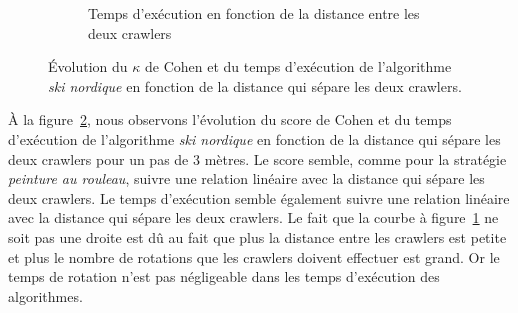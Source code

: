 \documentclass[francais,RandD]{rapportPFE}
\begin{document}
\begin{figure}[h!]
\begin{subfigure}[t]{0.49\linewidth}
						\caption{Temps d'exécution en fonction de la distance entre les deux crawlers}
						\label{fig:ski_nordique-time_vs_distance}
				\end{subfigure}
				\caption{Évolution du $\kappa$ de Cohen et du temps d'exécution de l'algorithme \textit{ski nordique} en fonction de la distance qui sépare les deux crawlers.}
				\label{fig:ski_nordique-distance}
			\end{figure}

			À la figure~\ref{fig:ski_nordique-distance}, nous observons l'évolution du score de Cohen et du temps d'exécution de l'algorithme \textit{ski nordique} en fonction de la distance qui sépare les deux crawlers pour un pas de 3 mètres.
			Le score semble, comme pour la stratégie \textit{peinture au rouleau}, suivre une relation linéaire avec la distance qui sépare les deux crawlers.
			Le temps d'exécution semble également suivre une relation linéaire avec la distance qui sépare les deux crawlers.
			Le fait que la courbe à figure~\ref{fig:ski_nordique-time_vs_distance} ne soit pas une droite est dû au fait que plus la distance entre les crawlers est petite et plus le nombre de rotations que les crawlers doivent effectuer est grand.
			Or le temps de rotation n'est pas négligeable dans les temps d'exécution des algorithmes.
\end{document}
